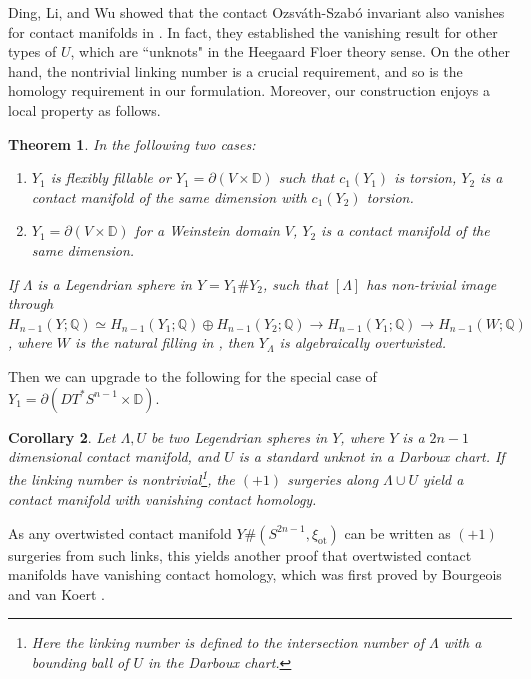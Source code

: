 \documentclass[reqno,11pt]{amsart}
\numberwithin{equation}{section}
\newtheorem{theorem}{\textbf{Theorem}}[section]
\newtheorem{corollary}[theorem]{\textbf{Corollary}}
\def\D{{\mathbb D}}
\def\Q{{\mathbb Q}}
\begin{document}
Ding, Li, and Wu \cite[Theorem 1.1]{DLW} showed that the contact Ozsv\'ath-Szab\'o invariant also vanishes for contact manifolds in . In fact, they established the vanishing result for other types of $U$, which are ``unknots" in the Heegaard Floer theory sense. On the other hand, the nontrivial linking number is a crucial requirement, and so is the homology requirement in our formulation. Moreover, our construction enjoys a local property as follows.

\begin{theorem}\label{thm:main'}
    In the following two cases:
    \begin{enumerate}
        \item\label{thm1} $Y_1$ is flexibly fillable or $Y_1=\partial(V\times \D)$ such that $c_1(Y_1)$ is torsion, $Y_2$ is a contact manifold of the same dimension with $c_1(Y_2)$ torsion.
        \item\label{thm2} $Y_1=\partial(V\times \D)$ for a Weinstein domain $V$, $Y_2$ is a contact manifold of the same dimension.
    \end{enumerate}
    If $\Lambda$ is a Legendrian sphere in $Y=Y_1\# Y_2$, such that $[\Lambda]$ has non-trivial image through $H_{n-1}(Y;\Q)\simeq H_{n-1}(Y_1;\Q)\oplus H_{n-1}(Y_2;\Q)\to H_{n-1}(Y_1;\Q) \to H_{n-1}(W;\Q)$, where $W$ is the natural filling in , then $Y_{\Lambda}$ is algebraically overtwisted.
\end{theorem}
Then we can upgrade  to the following for the special case of $Y_1=\partial(DT^*S^{n-1}\times \D)$.
\begin{corollary}
    Let $\Lambda,U$ be two Legendrian spheres in $Y$, where $Y$ is a $2n-1$ dimensional contact manifold, and $U$ is a standard unknot in a Darboux chart. If the linking number is nontrivial\footnote{Here the linking number is defined to the intersection number of $\Lambda$ with a bounding ball of $U$ in the Darboux chart.},  the $(+1)$ surgeries along $\Lambda \cup U$ yield a contact manifold with vanishing contact homology.
\end{corollary}
As any overtwisted contact manifold $Y\# (S^{2n-1},\xi_{\mathrm{ot}})$ can be written as $(+1)$ surgeries from such links, this yields another proof that overtwisted contact manifolds have vanishing contact homology, which was first proved by Bourgeois and van Koert \cite{zbMATH05709738}. %
\end{document}
